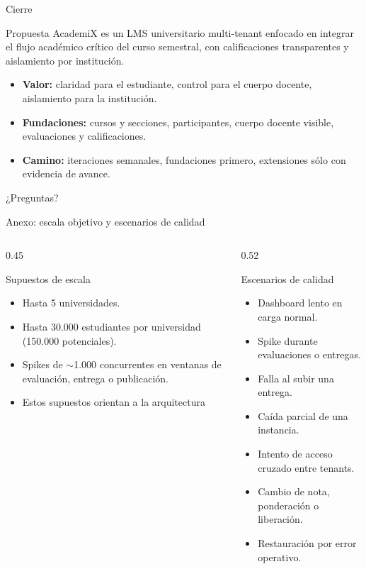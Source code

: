 \documentclass[aspectratio=169,10pt]{beamer}
\begin{document}
\begin{frame}{Cierre}
\begin{block}{Propuesta}
AcademiX es un LMS universitario multi-tenant enfocado en integrar el flujo académico crítico del curso semestral, con calificaciones transparentes y aislamiento por institución.
\end{block}
\begin{itemize}
  \item \textbf{Valor:} claridad para el estudiante, control para el cuerpo docente, aislamiento para la institución.
  \item \textbf{Fundaciones:} cursos y secciones, participantes, cuerpo docente visible, evaluaciones y calificaciones.
  \item \textbf{Camino:} iteraciones semanales, fundaciones primero, extensiones sólo con evidencia de avance.
\end{itemize}
\vspace{0.2cm}
\centering\small ¿Preguntas?
\end{frame}

\appendix

\begin{frame}{Anexo: escala objetivo y escenarios de calidad}
\small
\begin{columns}[T,onlytextwidth]
\begin{column}{0.45\textwidth}
\begin{block}{Supuestos de escala}
\footnotesize
\begin{itemize}
  \item Hasta 5 universidades.
  \item Hasta 30.000 estudiantes por universidad (150.000 potenciales).
  \item Spikes de $\sim$1.000 concurrentes en ventanas de evaluación, entrega o publicación.
  \item Estos supuestos orientan a la arquitectura
\end{itemize}
\end{block}
\end{column}
\begin{column}{0.52\textwidth}
\begin{block}{Escenarios de calidad}
\footnotesize
\begin{itemize}
  \item Dashboard lento en carga normal.
  \item Spike durante evaluaciones o entregas.
  \item Falla al subir una entrega.
  \item Caída parcial de una instancia.
  \item Intento de acceso cruzado entre tenants.
  \item Cambio de nota, ponderación o liberación.
  \item Restauración por error operativo.
\end{itemize}
\end{block}
\end{column}
\end{columns}
\end{frame}
\end{document}
